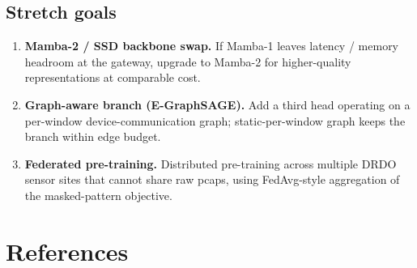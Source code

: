 \documentclass[11pt,a4paper]{article}
\begin{document}
\subsection{Stretch goals}
\begin{enumerate}[leftmargin=*, itemsep=2pt]
  \item \textbf{Mamba-2 / SSD backbone swap.} If Mamba-1 leaves latency / memory headroom at the gateway, upgrade to Mamba-2 for higher-quality representations at comparable cost.
  \item \textbf{Graph-aware branch (E-GraphSAGE).} Add a third head operating on a per-window device-communication graph; static-per-window graph keeps the branch within edge budget.
  \item \textbf{Federated pre-training.} Distributed pre-training across multiple DRDO sensor sites that cannot share raw pcaps, using FedAvg-style aggregation of the masked-pattern objective.
\end{enumerate}

\section*{References}
\end{document}

